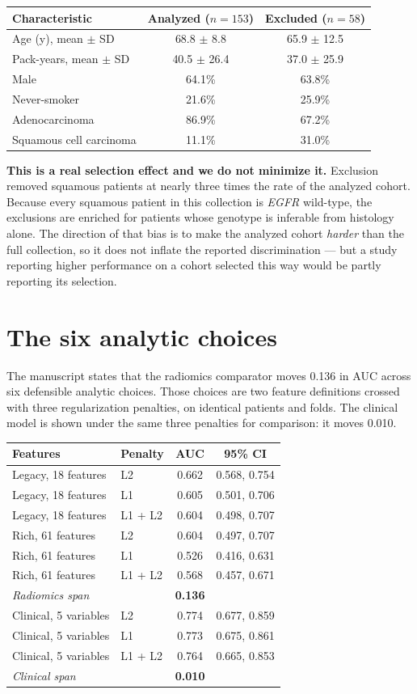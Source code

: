 \documentclass[11pt]{article}
\begin{document}
\begin{tabular}{lcc}
\toprule
Characteristic & Analyzed ($n=153$) & Excluded ($n=58$) \\
\midrule
Age (y), mean $\pm$ SD & 68.8 $\pm$ 8.8 & 65.9 $\pm$ 12.5 \\
Pack-years, mean $\pm$ SD & 40.5 $\pm$ 26.4 & 37.0 $\pm$ 25.9 \\
Male & 64.1\% & 63.8\% \\
Never-smoker & 21.6\% & 25.9\% \\
Adenocarcinoma & 86.9\% & 67.2\% \\
Squamous cell carcinoma & 11.1\% & 31.0\% \\
\bottomrule
\end{tabular}

\textbf{This is a real selection effect and we do not minimize it.} Exclusion
removed squamous patients at nearly three times the rate of the analyzed cohort.
Because every squamous patient in this collection is \textit{EGFR} wild-type, the
exclusions are enriched for patients whose genotype is inferable from histology
alone. The direction of that bias is to make the analyzed cohort \textit{harder}
than the full collection, so it does not inflate the reported discrimination ---
but a study reporting higher performance on a cohort selected this way would be
partly reporting its selection.

\section{The six analytic choices}

The manuscript states that the radiomics comparator moves 0.136 in AUC across six
defensible analytic choices. Those choices are two feature definitions crossed
with three regularization penalties, on identical patients and folds. The
clinical model is shown under the same three penalties for comparison: it moves
0.010.

\begin{tabular}{llcc}
\toprule
Features & Penalty & AUC & 95\% CI \\
\midrule
Legacy, 18 features & L2 & 0.662 & 0.568, 0.754 \\
Legacy, 18 features & L1 & 0.605 & 0.501, 0.706 \\
Legacy, 18 features & L1 + L2 & 0.604 & 0.498, 0.707 \\
Rich, 61 features & L2 & 0.604 & 0.497, 0.707 \\
Rich, 61 features & L1 & 0.526 & 0.416, 0.631 \\
Rich, 61 features & L1 + L2 & 0.568 & 0.457, 0.671 \\
\midrule
\multicolumn{2}{l}{\textit{Radiomics span}} & \textbf{0.136} & \\
\midrule
Clinical, 5 variables & L2 & 0.774 & 0.677, 0.859 \\
Clinical, 5 variables & L1 & 0.773 & 0.675, 0.861 \\
Clinical, 5 variables & L1 + L2 & 0.764 & 0.665, 0.853 \\
\multicolumn{2}{l}{\textit{Clinical span}} & \textbf{0.010} & \\
\bottomrule
\end{tabular}
\end{document}
